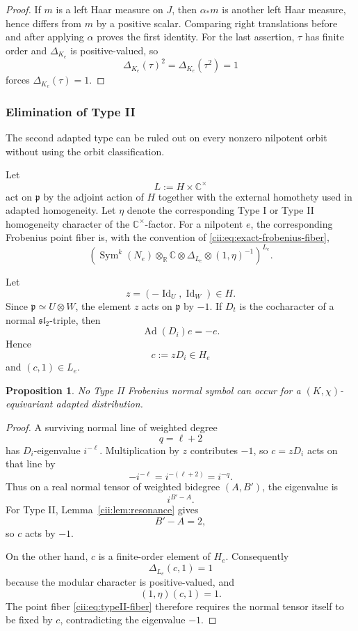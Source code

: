 \documentclass[11pt,reqno]{amsart}
\numberwithin{equation}{section}
\newtheorem{proposition}[theorem]{Proposition}
\theoremstyle{definition}
\theoremstyle{remark}
\newcommand{\C}{\mathbb C}
\newcommand{\R}{\mathbb R}
\newcommand{\Sym}{\operatorname{Sym}}
\newcommand{\Ad}{\operatorname{Ad}}
\newcommand{\Id}{\operatorname{Id}}
\begin{document}
\begin{proof}
If \(m\) is a left Haar measure on \(J\), then \(\alpha_*m\) is another
left Haar measure, hence differs from \(m\) by a positive scalar.
Comparing right translations before and after applying \(\alpha\) proves
the first identity.  For the last assertion, \(\tau\) has finite order
and \(\Delta_{K_e}\) is positive-valued, so
\[
\Delta_{K_e}(\tau)^2=\Delta_{K_e}(\tau^2)=1
\]
forces \(\Delta_{K_e}(\tau)=1\).
\end{proof}


\subsubsection{Elimination of Type II}

The second adapted type can be ruled out on every nonzero nilpotent orbit
without using the orbit classification.

Let
\[
L:=H\times\C^\times
\]
act on \(\mathfrak p\) by the adjoint action of \(H\) together with the
external homothety used in adapted homogeneity.  Let \(\eta\) denote the
corresponding Type I or Type II homogeneity character of the
\(\C^\times\)-factor.  For a nilpotent \(e\), the corresponding Frobenius point fiber is,
with the convention of
\eqref{cii:eq:exact-frobenius-fiber},
\begin{equation}\label{cii:eq:typeII-fiber}
\left(
\Sym^k(N_e)\otimes_{\R}\C
\otimes\Delta_{L_e}
\otimes(1,\eta)^{-1}
\right)^{L_e}.
\end{equation}

Let
\[
z=(-\Id_U,\Id_W)\in H.
\]
Since \(\mathfrak p\simeq U\otimes W\), the element \(z\) acts on
\(\mathfrak p\) by \(-1\).  If \(D_t\) is the cocharacter of a normal
\(\mathfrak{sl}_2\)-triple, then
\[
\Ad(D_i)e=-e.
\]
Hence
\[
c:=zD_i\in H_e
\]
and \((c,1)\in L_e\).

\begin{proposition}\label{cii:prop:typeII}
No Type II Frobenius normal symbol can occur for a
\((K,\chi)\)-equivariant adapted distribution.
\end{proposition}

\begin{proof}
A surviving normal line of weighted degree
\[
q=\ell+2
\]
has \(D_i\)-eigenvalue \(i^{-\ell}\).  Multiplication by \(z\) contributes
\(-1\), so \(c=zD_i\) acts on that line by
\[
-i^{-\ell}=i^{-(\ell+2)}=i^{-q}.
\]
Thus on a real normal tensor of weighted bidegree \((A,B')\), the
eigenvalue is
\[
i^{B'-A}.
\]
For Type II, Lemma~\ref{cii:lem:resonance} gives
\[
B'-A=2,
\]
so \(c\) acts by \(-1\).

On the other hand, \(c\) is a finite-order element of \(H_e\).
Consequently
\[
\Delta_{L_e}(c,1)=1
\]
because the modular character is positive-valued, and
\[
(1,\eta)(c,1)=1.
\]
The point fiber \eqref{cii:eq:typeII-fiber} therefore requires the normal tensor itself to be
fixed by \(c\), contradicting the eigenvalue \(-1\).
\end{proof}
\end{document}
